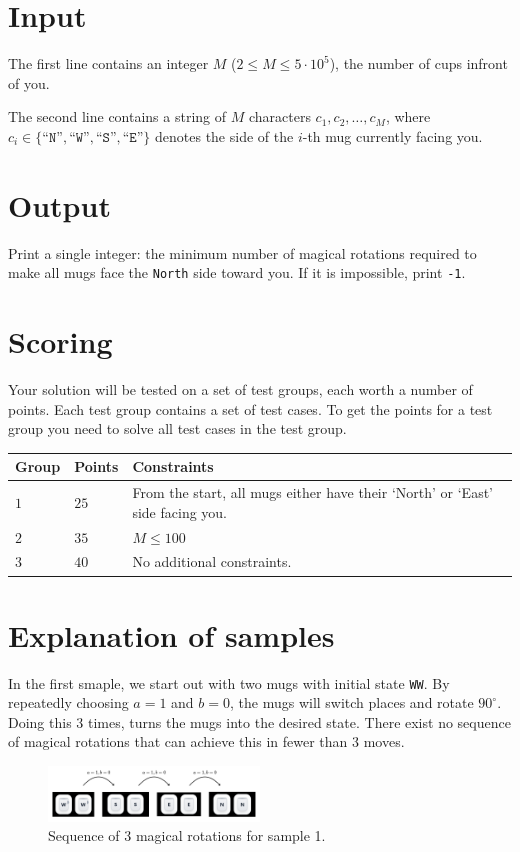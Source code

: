 \section*{Input}
The first line contains an integer $M$ ($2 \leq M \leq 5 \cdot 10^5$), the number of cups infront of you.

The second line contains a string of $M$ characters $c_1, c_2, \dots, c_M$, where $c_i \in \{\texttt{``N''},\texttt{``W''},\texttt{``S''},\texttt{``E''}\}$ denotes the side of the $i$-th mug currently facing you.

\section*{Output}
Print a single integer: the minimum number of magical rotations required to make all mugs face the \texttt{North} side toward you. If it is impossible, print \texttt{-1}.

\section*{Scoring}
Your solution will be tested on a set of test groups, each worth a number of points. Each test group contains
a set of test cases. To get the points for a test group you need to solve all test cases in the test group.

\noindent
\begin{tabular}{| l | l | p{12cm} |}
  \hline
  \textbf{Group} & \textbf{Points} & \textbf{Constraints} \\ \hline
  $1$    & $25$       & From the start, all mugs either have their `North' or `East' side facing you. \\ \hline
  $2$    & $35$       & $M \leq 100$ \\ \hline
  $3$    & $40$       & No additional constraints. \\ \hline
\end{tabular}


\section*{Explanation of samples}
\noindent
In the first smaple, we start out with two mugs with initial state \texttt{WW}. 
By repeatedly choosing $a = 1$ and $b = 0$, the mugs will switch places and rotate $90^\circ$. Doing this 3 times, turns the mugs into the desired state. 
There exist no sequence of magical rotations that can achieve this in fewer than 3 moves.
\begin{figure}[h!]
  \centering
  \includegraphics[width=0.5\textwidth]{sample1.png}
  \caption{Sequence of 3 magical rotations for sample 1.}
\end{figure}


